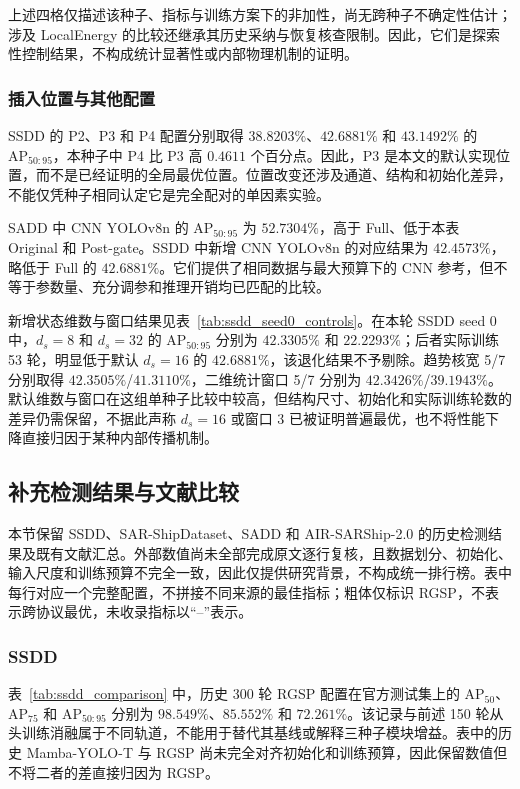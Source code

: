 \documentclass[journal]{IEEEtran}
\begin{document}
上述四格仅描述该种子、指标与训练方案下的非加性，尚无跨种子不确定性估计；涉及 LocalEnergy 的比较还继承其历史采纳与恢复核查限制。因此，它们是探索性控制结果，不构成统计显著性或内部物理机制的证明。

\subsubsection{插入位置与其他配置}

SSDD 的 P2、P3 和 P4 配置分别取得 $38.8203\%$、$42.6881\%$ 和 $43.1492\%$ 的 $\mathrm{AP}_{50:95}$，本种子中 P4 比 P3 高 $0.4611$ 个百分点。因此，P3 是本文的默认实现位置，而不是已经证明的全局最优位置。位置改变还涉及通道、结构和初始化差异，不能仅凭种子相同认定它是完全配对的单因素实验。

SADD 中 CNN YOLOv8n 的 $\mathrm{AP}_{50:95}$ 为 $52.7304\%$，高于 Full、低于本表 Original 和 Post-gate。SSDD 中新增 CNN YOLOv8n 的对应结果为 $42.4573\%$，略低于 Full 的 $42.6881\%$。它们提供了相同数据与最大预算下的 CNN 参考，但不等于参数量、充分调参和推理开销均已匹配的比较。

新增状态维数与窗口结果见表~\ref{tab:ssdd_seed0_controls}。在本轮 SSDD seed 0 中，$d_s=8$ 和 $d_s=32$ 的 $\mathrm{AP}_{50:95}$ 分别为 $42.3305\%$ 和 $22.2293\%$；后者实际训练 53 轮，明显低于默认 $d_s=16$ 的 $42.6881\%$，该退化结果不予剔除。趋势核宽 5/7 分别取得 $42.3505\%$/$41.3110\%$，二维统计窗口 5/7 分别为 $42.3426\%$/$39.1943\%$。默认维数与窗口在这组单种子比较中较高，但结构尺寸、初始化和实际训练轮数的差异仍需保留，不据此声称 $d_s=16$ 或窗口 3 已被证明普遍最优，也不将性能下降直接归因于某种内部传播机制。

\FloatBarrier


\subsection{补充检测结果与文献比较}
\label{sec:detection_results}

本节保留 SSDD、SAR-ShipDataset、SADD 和 AIR-SARShip-2.0 的历史检测结果及既有文献汇总。外部数值尚未全部完成原文逐行复核，且数据划分、初始化、输入尺度和训练预算不完全一致，因此仅提供研究背景，不构成统一排行榜。表中每行对应一个完整配置，不拼接不同来源的最佳指标；粗体仅标识 RGSP，不表示跨协议最优，未收录指标以“--”表示。

\subsubsection{SSDD}
\label{sec:ssdd_results}

表~\ref{tab:ssdd_comparison} 中，历史 300 轮 RGSP 配置在官方测试集上的 $\mathrm{AP}_{50}$、$\mathrm{AP}_{75}$ 和 $\mathrm{AP}_{50:95}$ 分别为 $98.549\%$、$85.552\%$ 和 $72.261\%$。该记录与前述 150 轮从头训练消融属于不同轨道，不能用于替代其基线或解释三种子模块增益。表中的历史 Mamba-YOLO-T 与 RGSP 尚未完全对齐初始化和训练预算，因此保留数值但不将二者的差直接归因为 RGSP。
\end{document}
